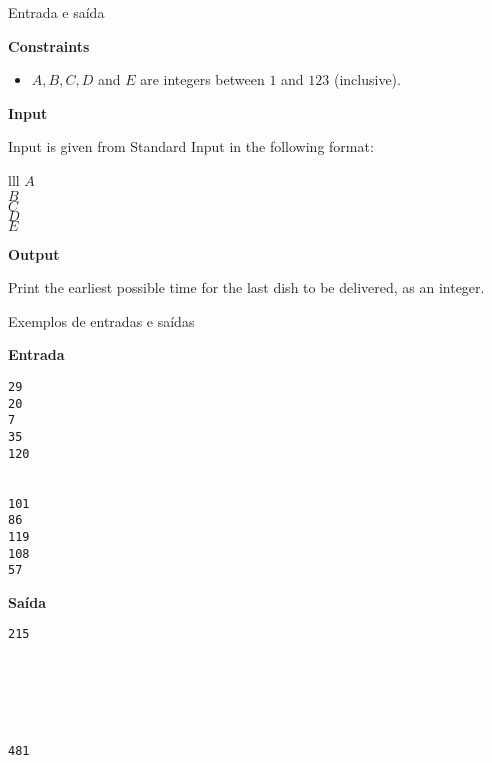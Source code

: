 \begin{frame}[fragile]{Entrada e saída}

\textbf{Constraints}

\begin{itemize}
    \item $A,B,C,D$ and $E$ are integers between $1$ and $123$ (inclusive).
\end{itemize}

\vspace{0.1in}

\textbf{Input}

Input is given from Standard Input in the following format:
\begin{atcoderio}{lll}
$A$ \\
$B$ \\
$C$ \\
$D$ \\
$E$ \\
\end{atcoderio}

\textbf{Output}

Print the earliest possible time for the last dish to be delivered, as an integer.

\end{frame}

\begin{frame}[fragile]{Exemplos de entradas e saídas}

\begin{minipage}[t]{0.45\textwidth}
\textbf{Entrada}
\begin{verbatim}
29
20
7
35
120


101
86
119
108
57
\end{verbatim}
\end{minipage}
\begin{minipage}[t]{0.5\textwidth}
\textbf{Saída}
\begin{verbatim}
215






481
\end{verbatim}
\end{minipage}
\end{frame}


